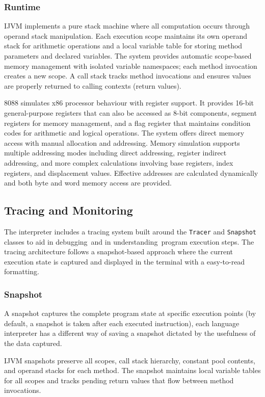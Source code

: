 \documentclass[11pt]{article}
\begin{document}
\subsubsection{Runtime}
IJVM implements a pure stack machine where all computation occurs through operand stack manipulation. Each execution scope maintains its own operand stack for arithmetic operations and a local variable table for storing method parameters and declared variables. The system provides automatic scope-based memory management with isolated variable namespaces; each method invocation creates a new scope. A call stack tracks method invocations and ensures values are properly returned to calling contexts (return values).

8088 simulates x86 processor behaviour with register support. It provides 16-bit general-purpose registers that can also be accessed as 8-bit components, segment registers for memory management, and a flag register that maintains condition codes for arithmetic and logical operations. The system offers direct memory access with manual allocation and addressing. Memory simulation supports multiple addressing modes including direct addressing, register indirect addressing, and more complex calculations involving base registers, index registers, and displacement values. Effective addresses are calculated dynamically and both byte and word memory access are provided.

\subsection{Tracing and Monitoring}
The interpreter includes a tracing system built around the \texttt{Tracer} and \texttt{Snapshot} classes to aid in debugging and in understanding program execution steps. The tracing architecture follows a snapshot-based approach where the current execution state is captured and displayed in the terminal with a easy-to-read formatting.

\subsubsection{Snapshot}
A snapshot captures the complete program state at specific execution points (by default, a snapshot is taken after each executed instruction), each language interpreter has a different way of saving a snapshot dictated by the usefulness of the data captured.

IJVM snapshots preserve all scopes, call stack hierarchy, constant pool contents, and operand stacks for each method. The snapshot maintains local variable tables for all scopes and tracks pending return values that flow between method invocations.
\end{document}
